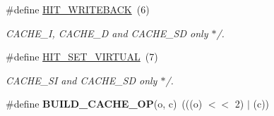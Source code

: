 \begin{DoxyCompactItemize}
\mbox{\label{group__mips__regs_ga8fe54f84daef50318a97d2fa989d1573}} 
\#define \mbox{\hyperlink{group__mips__regs_ga8fe54f84daef50318a97d2fa989d1573}{H\+I\+T\+\_\+\+W\+R\+I\+T\+E\+B\+A\+CK}}~(6)
\begin{DoxyCompactList}\small\item\em C\+A\+C\+H\+E\+\_\+I, C\+A\+C\+H\+E\+\_\+D and C\+A\+C\+H\+E\+\_\+\+SD only $\ast$/. \end{DoxyCompactList}\item 
\mbox{\label{group__mips__regs_gab35e7de12f3d04df816bd97f619fccf1}} 
\#define \mbox{\hyperlink{group__mips__regs_gab35e7de12f3d04df816bd97f619fccf1}{H\+I\+T\+\_\+\+S\+E\+T\+\_\+\+V\+I\+R\+T\+U\+AL}}~(7)
\begin{DoxyCompactList}\small\item\em C\+A\+C\+H\+E\+\_\+\+SI and C\+A\+C\+H\+E\+\_\+\+SD only $\ast$/. \end{DoxyCompactList}\item 
\mbox{\label{group__mips__regs_ga4dc3ed390a4bf40c2b8fa028dc6c2dd6}} 
\#define {\bfseries B\+U\+I\+L\+D\+\_\+\+C\+A\+C\+H\+E\+\_\+\+OP}(o,  c)~(((o) $<$$<$ 2) $\vert$ (c))
\end{DoxyCompactItemize}
